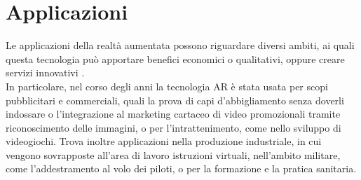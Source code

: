 \documentclass[crop=false, class=book]{standalone}
\begin{document}
	\section{Applicazioni}	
	Le applicazioni della realtà aumentata possono riguardare diversi ambiti, ai quali questa tecnologia può apportare benefici economici o qualitativi, oppure creare servizi innovativi \cite{carmigniani2011augmented}. 
	\\
	In particolare, nel corso degli anni la tecnologia AR è stata usata per scopi pubblicitari e commerciali, quali la prova di capi d'abbigliamento senza doverli indossare o l'integrazione al marketing cartaceo di video promozionali tramite riconoscimento delle immagini, o per l'intrattenimento, come nello sviluppo di videogiochi. Trova inoltre applicazioni nella produzione industriale, in cui vengono sovrapposte all'area di lavoro istruzioni virtuali, nell'ambito militare, come l'addestramento al volo dei piloti, o per la formazione e la pratica sanitaria.
\end{document}
